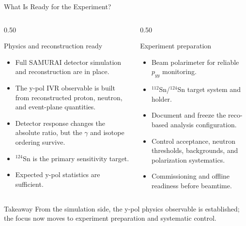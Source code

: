 \documentclass[aspectratio=169]{beamer}
\newcommand{\gpar}{\gamma}
\begin{document}
\begin{frame}{What Is Ready for the Experiment?}
  \footnotesize
  \begin{columns}[T,onlytextwidth]
    \begin{column}{0.50\textwidth}
      \begin{block}{Physics and reconstruction ready}
        \begin{itemize}
          \item Full SAMURAI detector simulation and reconstruction are in
                place.
          \item The y-pol IVR observable is built from reconstructed proton,
                neutron, and event-plane quantities.
          \item Detector response changes the absolute ratio, but the
                $\gpar$ and isotope ordering survive.
          \item $^{124}$Sn is the primary sensitivity target.
          \item Expected y-pol statistics are sufficient.
        \end{itemize}
      \end{block}
    \end{column}
    \begin{column}{0.50\textwidth}
      \begin{block}{Experiment preparation}
        \begin{itemize}
          \item Beam polarimeter for reliable $p_{yy}$ monitoring.
          \item $^{112}$Sn/$^{124}$Sn target system and holder.
          \item Document and freeze the reco-based analysis configuration.
          \item Control acceptance, neutron thresholds, backgrounds, and
                polarization systematics.
          \item Commissioning and offline readiness before beamtime.
        \end{itemize}
      \end{block}
    \end{column}
  \end{columns}
  \begin{block}{Takeaway}
    \centering
    From the simulation side, the y-pol physics observable is established; the
    focus now moves to experiment preparation and systematic control.
  \end{block}
\end{frame}
\end{document}
